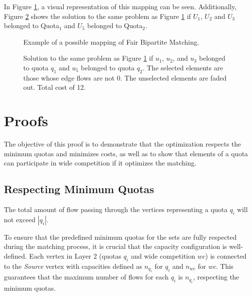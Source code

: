             In Figure \ref{fig:mapeamento}, a visual representation of this mapping can be seen. Additionally, Figure \ref{fig:solucao} shows the solution to the same problem as Figure \ref{fig:mapeamento} if $U_1$, $U_2$ and $U_3$ belonged to Quota$_1$ and $U_5$ belonged to Quota$_2$.
            
            \begin{figure}[!ht]
                \centering
                
                \caption{Example of a possible mapping of Fair Bipartite Matching.}
                \label{fig:mapeamento}
            \end{figure}
            
            \begin{figure}[!ht]
                \centering
                
                \caption{Solution to the same problem as Figure \ref{fig:mapeamento} if $u_1$, $u_2$, and $u_3$ belonged to quota $q_1$ and $u_5$ belonged to quota $q_2$. The selected elements are those whose edge flows are not 0. The unselected elements are faded out. Total cost of 12.}
                \label{fig:solucao}
            \end{figure}
        
        \section{Proofs}
        
        The objective of this proof is to demonstrate that the optimization respects the minimum quotas and minimizes costs, as well as to show that elements of a quota can participate in wide competition if it optimizes the matching.
        
        \subsection{Respecting Minimum Quotas}
        
        \begin{lemma}
           The total amount of flow passing through the vertices representing a quota $q_i$ will not exceed $|q_i|$.
        \end{lemma}
        
        To ensure that the predefined minimum quotas for the sets are fully respected during the matching process, it is crucial that the capacity configuration is well-defined. Each vertex in Layer 2 (quotas $q_i$ and wide competition $wc$) is connected to the \textit{Source} vertex with capacities defined as $n_{q_i}$ for $q_i$ and $n_{wc}$ for $wc$. This guarantees that the maximum number of flows for each $q_i$ is $n_{q_i}$, respecting the minimum quotas.
        
